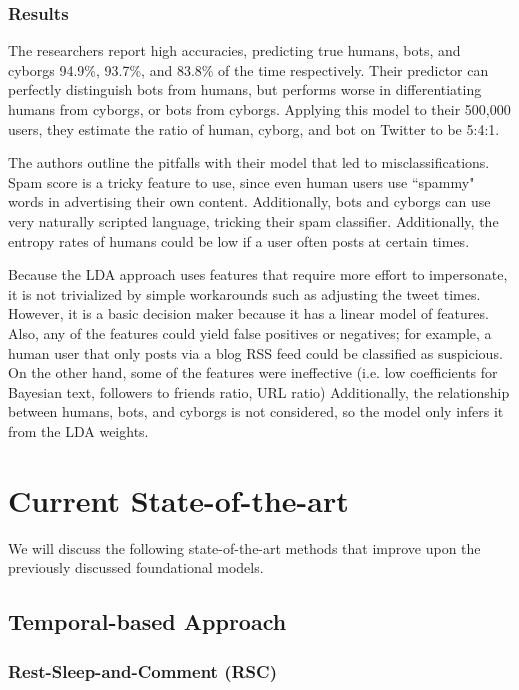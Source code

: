 \documentclass[11pt, oneside]{article}   	%
\begin{document}
\subsubsection*{Results}

\quad The researchers report high accuracies, predicting true humans, bots, and cyborgs 94.9\%, 93.7\%, and 83.8\% of the time respectively.
Their predictor can perfectly distinguish bots from humans, but performs worse in differentiating humans from cyborgs, or bots from cyborgs.
Applying this model to their 500,000 users, they estimate the ratio of human, cyborg, and bot on Twitter to be 5:4:1.

\quad The authors outline the pitfalls with their model that led to misclassifications.
Spam score is a tricky feature to use, since even human users use ``spammy" words in advertising their own content.
Additionally, bots and cyborgs can use very naturally scripted language, tricking their spam classifier.
Additionally, the entropy rates of humans could be low if a user often posts at certain times.

\quad Because the LDA approach uses features that require more effort to impersonate, it is not trivialized by simple workarounds such as adjusting the tweet times.
However, it is a basic decision maker because it has a linear model of features.
Also, any of the features could yield false positives or negatives; for example, a human user that only posts via a blog RSS feed could be classified as suspicious.
On the other hand, some of the features were ineffective (i.e. low coefficients for Bayesian text, followers to friends ratio, URL ratio)
Additionally, the relationship between humans, bots, and cyborgs is not considered, so the model only infers it from the LDA weights.

\section{Current State-of-the-art}  \label{cur_models}

\quad We will discuss the following state-of-the-art methods that improve upon the previously discussed foundational models.

\subsection{Temporal-based Approach}
\subsubsection{Rest-Sleep-and-Comment (RSC) }
\end{document}
